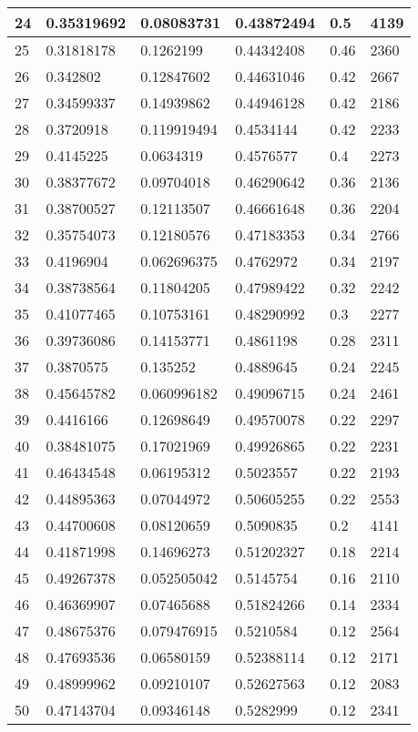 \begin{longtable}{|l|l|l|l|l|l|}
24 & 0.35319692 & 0.08083731 & 0.43872494 & 0.5 & 4139 \\ \hline 
25 & 0.31818178 & 0.1262199 & 0.44342408 & 0.46 & 2360 \\ \hline 
26 & 0.342802 & 0.12847602 & 0.44631046 & 0.42 & 2667 \\ \hline 
27 & 0.34599337 & 0.14939862 & 0.44946128 & 0.42 & 2186 \\ \hline 
28 & 0.3720918 & 0.119919494 & 0.4534144 & 0.42 & 2233 \\ \hline 
29 & 0.4145225 & 0.0634319 & 0.4576577 & 0.4 & 2273 \\ \hline 
30 & 0.38377672 & 0.09704018 & 0.46290642 & 0.36 & 2136 \\ \hline 
31 & 0.38700527 & 0.12113507 & 0.46661648 & 0.36 & 2204 \\ \hline 
32 & 0.35754073 & 0.12180576 & 0.47183353 & 0.34 & 2766 \\ \hline 
33 & 0.4196904 & 0.062696375 & 0.4762972 & 0.34 & 2197 \\ \hline 
34 & 0.38738564 & 0.11804205 & 0.47989422 & 0.32 & 2242 \\ \hline 
35 & 0.41077465 & 0.10753161 & 0.48290992 & 0.3 & 2277 \\ \hline 
36 & 0.39736086 & 0.14153771 & 0.4861198 & 0.28 & 2311 \\ \hline 
37 & 0.3870575 & 0.135252 & 0.4889645 & 0.24 & 2245 \\ \hline 
38 & 0.45645782 & 0.060996182 & 0.49096715 & 0.24 & 2461 \\ \hline 
39 & 0.4416166 & 0.12698649 & 0.49570078 & 0.22 & 2297 \\ \hline 
40 & 0.38481075 & 0.17021969 & 0.49926865 & 0.22 & 2231 \\ \hline 
41 & 0.46434548 & 0.06195312 & 0.5023557 & 0.22 & 2193 \\ \hline 
42 & 0.44895363 & 0.07044972 & 0.50605255 & 0.22 & 2553 \\ \hline 
43 & 0.44700608 & 0.08120659 & 0.5090835 & 0.2 & 4141 \\ \hline 
44 & 0.41871998 & 0.14696273 & 0.51202327 & 0.18 & 2214 \\ \hline 
45 & 0.49267378 & 0.052505042 & 0.5145754 & 0.16 & 2110 \\ \hline 
46 & 0.46369907 & 0.07465688 & 0.51824266 & 0.14 & 2334 \\ \hline 
47 & 0.48675376 & 0.079476915 & 0.5210584 & 0.12 & 2564 \\ \hline 
48 & 0.47693536 & 0.06580159 & 0.52388114 & 0.12 & 2171 \\ \hline 
49 & 0.48999962 & 0.09210107 & 0.52627563 & 0.12 & 2083 \\ \hline 
50 & 0.47143704 & 0.09346148 & 0.5282999 & 0.12 & 2341 \\ \hline 
\end{longtable}